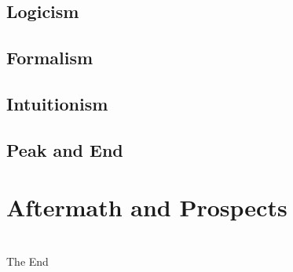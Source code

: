 \documentclass{beamer}
\begin{document}
\subsection{Logicism}
\begin{frame}
    \frametitle{}
\end{frame}
\subsection{Formalism}
\begin{frame}
    \frametitle{}
\end{frame}
\subsection{Intuitionism}
\begin{frame}
    \frametitle{}
\end{frame}
\subsection{Peak and End}
\begin{frame}
    \frametitle{}
\end{frame}
\section{Aftermath and Prospects}
\begin{frame}
    \frametitle{}
\end{frame}
\section*{}
\begin{frame}
    \Huge{\centerline{The End}}
\end{frame}

\newpage


\end{document}
